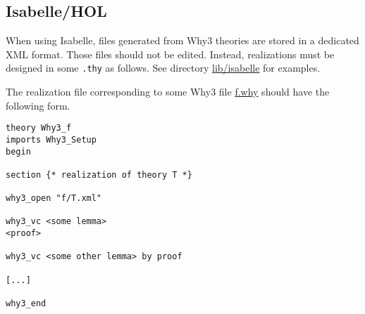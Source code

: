 \subsection{Isabelle/HOL}

When using Isabelle, files generated from Why3 theories are stored in
a dedicated XML format. Those files should not be edited. Instead,
realizations must be designed in some \texttt{.thy} as follows. See
directory \url{lib/isabelle} for examples.

The realization file corresponding to some Why3 file \url{f.why}
should have the following form. 
\begin{verbatim}
theory Why3_f
imports Why3_Setup
begin

section {* realization of theory T *}

why3_open "f/T.xml"

why3_vc <some lemma> 
<proof>

why3_vc <some other lemma> by proof

[...]

why3_end
\end{verbatim}

